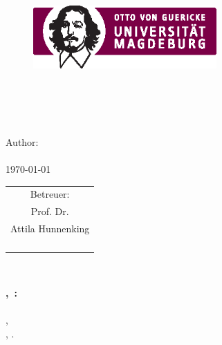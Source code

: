 
\begin{titlepage}
  \thispagestyle{titlepage}
  \begin{center}
  {\LARGE \myuniversity}\\[10mm]
  \begin{figure}[h]
   \hbox{}\hfill
   \begin{minipage}[t]{9cm}
			 \centering
			 \includegraphics[width=7cm]{logos/OVGU_SIGN_druck.eps}
   \end{minipage}
   \hfill\hbox{}
  \end{figure}
  {\large \myschool\\ \mydepartment}\\[10mm]
  {\LARGE \kindOfThesis}\\[5mm]
		{\Large\bf \titleOfThesis}\\[10mm]
  {\small Author:}\\[1mm]
  {\large \myfirstname~\mylastname}\\[5mm]
  {\small \today}\\[5mm]
   
  \vspace{3cm}
  \begin{tabular}{c}
  	\multicolumn{1}{c}{\small Betreuer:} \\[1mm]
  	{\small Prof. Dr.}  \\
  	{\large Attila Hunnenking} \\[2mm]
  	{\small \myschool}  \\
  	{\small \myuni}	\\
  	{\small \myunistreet} \\
  	{\small \myunizipcity}
  \end{tabular} \\[5mm]

 
\renewcommand{\arraystretch}{1}
  \end{center}
\end{titlepage}

\thispagestyle{empty}
\vspace*{\fill}
\cleardoublepage

\thispagestyle{empty}
\vspace*{\fill}
\begin{minipage}{.95\textwidth}
\textbf{\mylastname,~\myfirstname:}\\
\emph{\titleOfThesis}\\
\kindOfThesis, \myuni \\
\myplace, \myyear.
\end{minipage}

